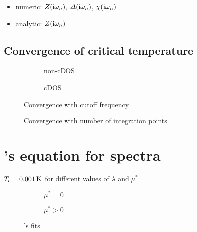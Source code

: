 \begin{itemize}
    \item numeric: $Z(\mathrm i \omega_n)$, $\varDelta(\mathrm i \omega_n)$, $\chi(\mathrm i \omega_n)$
    \item analytic: $Z(\mathrm i \omega_n)$
\end{itemize}

\subsection{Convergence of critical temperature}

\begin{figure}
    \small
    \begin{subfigure}{7cm}
        
        \caption{non-cDOS}
    \end{subfigure}%
    \begin{subfigure}{7cm}
        
        \caption{cDOS}
    \end{subfigure}
    \caption{Convergence with cutoff frequency}
\end{figure}

\begin{figure}
    \small
    \centering
    
    \caption{Convergence with number of integration points}
\end{figure}

\section{'s equation for  spectra}

\begin{table}
    \centering
    
    \caption{$T \sb{\text{c}} \pm 0.001\,\mathrm K$ for different values of $\lambda$ and
             $\mu^*$}
\end{table}

\begin{figure}
    \small
    \begin{subfigure}{7cm}
        
        \caption{$\mu^* = 0$}
    \end{subfigure}%
    \begin{subfigure}{7cm}
        
        \caption{$\mu^* > 0$}
    \end{subfigure}
    \caption{'s fits}
\end{figure}

